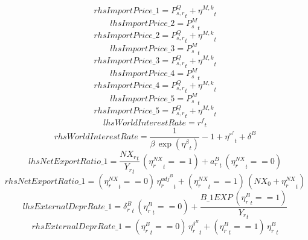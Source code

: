 \begin{dmath*}
rhsImportPrice\_1 = {{P^Q_{s,r}}}_{t}+{{\eta^{M,k}}}_{t}
\end{dmath*}
\begin{dmath*}
lhsImportPrice\_2 = {{P^{M}_s}}_{t}
\end{dmath*}
\begin{dmath*}
rhsImportPrice\_2 = {{P^Q_{s,r}}}_{t}+{{\eta^{M,k}}}_{t}
\end{dmath*}
\begin{dmath*}
lhsImportPrice\_3 = {{P^{M}_s}}_{t}
\end{dmath*}
\begin{dmath*}
rhsImportPrice\_3 = {{P^Q_{s,r}}}_{t}+{{\eta^{M,k}}}_{t}
\end{dmath*}
\begin{dmath*}
lhsImportPrice\_4 = {{P^{M}_s}}_{t}
\end{dmath*}
\begin{dmath*}
rhsImportPrice\_4 = {{P^Q_{s,r}}}_{t}+{{\eta^{M,k}}}_{t}
\end{dmath*}
\begin{dmath*}
lhsImportPrice\_5 = {{P^{M}_s}}_{t}
\end{dmath*}
\begin{dmath*}
rhsImportPrice\_5 = {{P^Q_{s,r}}}_{t}+{{\eta^{M,k}}}_{t}
\end{dmath*}
\begin{dmath*}
lhsWorldInterestRate = {{r^{f}}}_{t}
\end{dmath*}
\begin{dmath*}
rhsWorldInterestRate = \frac{1}{{{\beta}}\, \exp\left({{\eta^{\beta}}}_{t}\right)}-1+{{\eta^{r^f}}}_{t}+{{\delta^B}}
\end{dmath*}
\begin{dmath*}
lhsNetExportRatio\_1 = \frac{{{NX_r}}_{t}}{{{Y_r}}_{t}}\, \left({{\eta^{NX}_r}}_{t}==1\right)+{a^B_r}_{t}\, \left({{\eta^{NX}_r}}_{t}==0\right)
\end{dmath*}
\begin{dmath*}
rhsNetExportRatio\_1 = \left({{\eta^{NX}_r}}_{t}==0\right)\, {{\eta^{adj^B}_r}}_{t}+\left({{\eta^{NX}_r}}_{t}==1\right)\, \left({{NX_0}}+{{\eta^{NX}_r}}_{t}\right)
\end{dmath*}
\begin{dmath*}
lhsExternalDeprRate\_1 = {{\delta^{B}_r}}_{t}\, \left({{\eta^{B}_r}}_{t}==0\right)+\frac{{B\_1EXP}\, \left({{\eta^{B}_r}}_{t}==1\right)}{{{Y_r}}_{t}}
\end{dmath*}
\begin{dmath*}
rhsExternalDeprRate\_1 = \left({{\eta^{B}_r}}_{t}==0\right)\, {{\eta^{\delta^B}_r}}_{t}+\left({{\eta^{B}_r}}_{t}==1\right)\, {{\eta^{B}_r}}_{t}
\end{dmath*}
